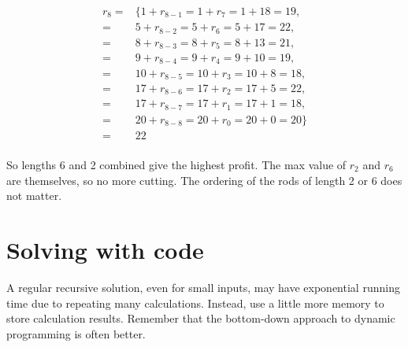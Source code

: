 \documentclass{article}
\begin{document}
\begin{equation*} \label{rc8}
\begin{split}
r_8 = & \{ 1+r_{8-1} =1+r_7 = 1+18 =19,\\
    = & 5+r_{8-2} =5+r_6 = 5+17 =22,\\
    = & 8+r_{8-3} =8+r_5 = 8+13 =21,\\
    = & 9+r_{8-4} =9+r_4 = 9+10 =19,\\
    = & 10+r_{8-5}=10+r_3= 10+8 =18,\\
    = & 17+r_{8-6}=17+r_2= 17+5 =22,\\
    = & 17+r_{8-7}=17+r_1= 17+1 =18,\\
    = & 20+r_{8-8}=20+r_0= 20+0 =20 \}\\
    = & 22\\ 
\end{split}
\end{equation*}

So lengths 6 and 2 combined give the highest profit. The max value of $r_2$ and $r_6$ are themselves, so no more cutting. The ordering of the rods of length 2 or 6 does not matter.

\section*{Solving with code}
A regular recursive solution, even for small inputs, may have exponential running time due to repeating many calculations. Instead, use a little more memory to store calculation results. Remember that the bottom-down approach to dynamic programming is often better.
\end{document}
